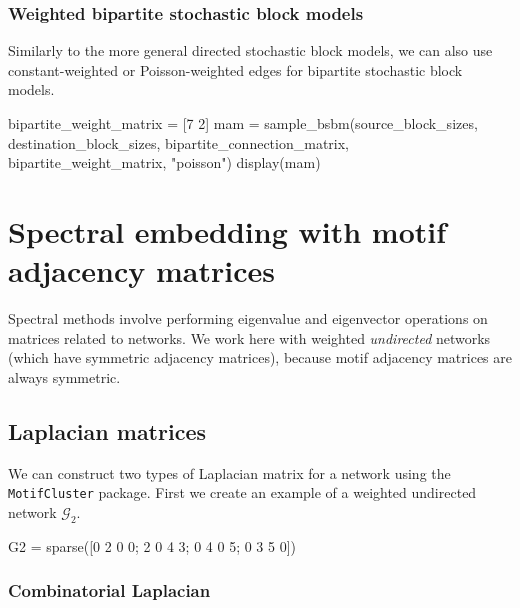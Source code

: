 \documentclass{article}
\begin{document}
\subsubsection{Weighted bipartite stochastic block models}

Similarly to the more general directed stochastic block models,
we can also use constant-weighted or Poisson-weighted edges for bipartite
stochastic block models.

\begin{tcolorbox}[colback=black!5!white,colframe=black!15!white]
\begin{juliablock}
bipartite_weight_matrix = [7 2]
mam = sample_bsbm(source_block_sizes, destination_block_sizes,
                  bipartite_connection_matrix, bipartite_weight_matrix, "poisson")
display(mam)
\end{juliablock}
\texttt{\obeylines\printpythontex}
\end{tcolorbox}




\section{Spectral embedding with motif adjacency matrices}

Spectral methods involve performing eigenvalue and
eigenvector operations on matrices related to networks.
We work here with weighted \emph{undirected} networks
(which have symmetric adjacency matrices),
because motif adjacency matrices are always symmetric.

\subsection{Laplacian matrices}

We can construct two types of Laplacian matrix for a network
using the \texttt{MotifCluster} package.
First we create an example of a weighted undirected network $\mathcal{G}_2$.

\begin{tcolorbox}[colback=black!5!white,colframe=black!15!white]
\begin{juliablock}
G2 = sparse([0 2 0 0; 2 0 4 3; 0 4 0 5; 0 3 5 0])
\end{juliablock}
\end{tcolorbox}

\subsubsection{Combinatorial Laplacian}
\end{document}
